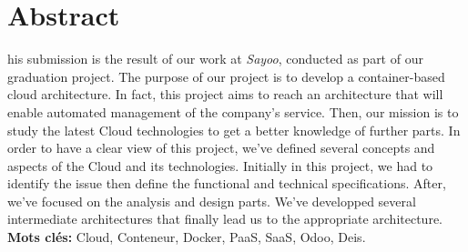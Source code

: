
\chapter*{Abstract}
\begin{singlespace}
his submission is the result of our work at \emph{Sayoo}, conducted as part of our graduation project. The purpose of our project is to develop a container-based cloud architecture. 
\newline
\newline
In fact, this project aims to reach an architecture that will enable automated management of the company's service. Then, our mission is to study the latest Cloud technologies to get a better knowledge of further parts.
\noindent In order to have a clear view of this project, we've defined several concepts and aspects of the Cloud and its technologies.
\newline
\newline
Initially in this project, we had to identify the issue then define the functional and technical specifications. After, we've focused on the analysis and design parts. We've developped several intermediate architectures that finally lead us to the appropriate architecture.
\vfill{\textbf{Mots clés:} Cloud, Conteneur, Docker, PaaS, SaaS, Odoo, Deis.}
\end{singlespace}